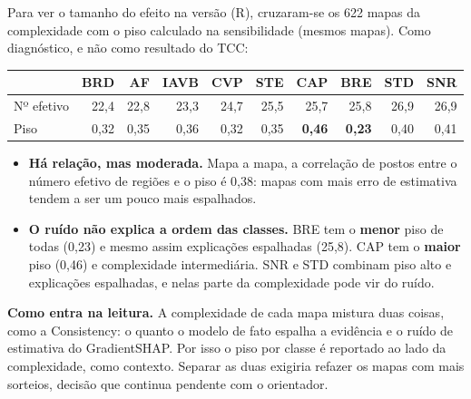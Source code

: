 \documentclass[11pt,a4paper]{article}
\begin{document}
Para ver o tamanho do efeito na versão (R), cruzaram-se os 622 mapas da complexidade com o piso calculado na sensibilidade (mesmos mapas). Como diagnóstico, e não como resultado do TCC:
\begin{center}\small
\begin{tabular}{lrrrrrrrrr}
\toprule
& \textbf{BRD} & \textbf{AF} & \textbf{IAVB} & \textbf{CVP} & \textbf{STE} & \textbf{CAP} & \textbf{BRE} & \textbf{STD} & \textbf{SNR} \\
\midrule
Nº efetivo & 22,4 & 22,8 & 23,3 & 24,7 & 25,5 & 25,7 & 25,8 & 26,9 & 26,9 \\
Piso & 0,32 & 0,35 & 0,36 & 0,32 & 0,35 & \textbf{0,46} & \textbf{0,23} & 0,40 & 0,41 \\
\bottomrule
\end{tabular}
\end{center}
\begin{itemize}
\item \textbf{Há relação, mas moderada.} Mapa a mapa, a correlação de postos entre o número efetivo de regiões e o piso é 0,38: mapas com mais erro de estimativa tendem a ser um pouco mais espalhados.
\item \textbf{O ruído não explica a ordem das classes.} BRE tem o \textbf{menor} piso de todas (0,23) e mesmo assim explicações espalhadas (25,8). CAP tem o \textbf{maior} piso (0,46) e complexidade intermediária. SNR e STD combinam piso alto e explicações espalhadas, e nelas parte da complexidade pode vir do ruído.
\end{itemize}
\textbf{Como entra na leitura.} A complexidade de cada mapa mistura duas coisas, como a Consistency: o quanto o modelo de fato espalha a evidência e o ruído de estimativa do GradientSHAP. Por isso o piso por classe é reportado ao lado da complexidade, como contexto. Separar as duas exigiria refazer os mapas com mais sorteios, decisão que continua pendente com o orientador.
\end{document}
